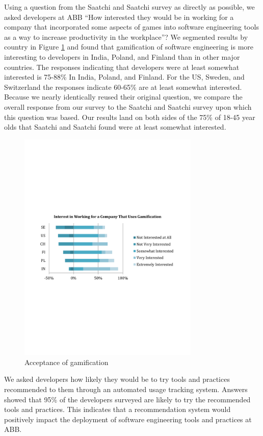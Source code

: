 \documentclass{sig-alternate}
\begin{document}
Using a question from the Saatchi and Saatchi survey \cite{wbsnipes:SaatchiGameification} as directly as possible, we asked developers at ABB ``How interested they would be in working for a company that incorporated some aspects of games into software engineering tools as a way to increase productivity in the workplace''?  We segmented results by country in Figure \ref{fig:gamification} and found that gamification of software engineering is more interesting to developers in India, Poland, and Finland than in other major countries.  The responses indicating that developers were at least somewhat interested is 75-88\% In India, Poland, and Finland.  For the US, Sweden, and Switzerland the responses indicate 60-65\% are at least somewhat interested.  Because we nearly identically reused their original question, we compare the overall response from our survey to the Saatchi and Saatchi survey\cite{wbsnipes:SaatchiGameification} upon which this question was based.  Our results land on both sides of the 75\% of 18-45 year olds that Saatchi and Saatchi found were at least somewhat interested.  

\begin{figure}
	\includegraphics[width=3.4in]{gamificationquestion.pdf}
	\caption{Acceptance of gamification}
	\label{fig:gamification}
\end{figure}

We asked developers how likely they would be to try tools and practices recommended to them through an automated usage tracking system.  Answers showed that 95\% of the developers surveyed are likely to try the recommended tools and practices.  This indicates that a recommendation system would positively impact the deployment of software engineering tools and practices at ABB.
\end{document}
